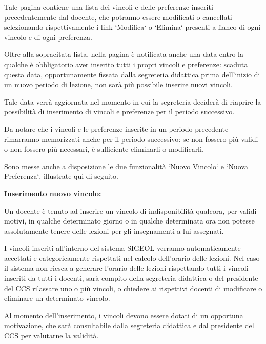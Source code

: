 \documentclass[11pt,a4paper]{article}
\begin{document}
Tale pagina contiene una lista dei vincoli e delle preferenze inseriti precedentemente dal docente, che potranno essere modificati o cancellati selezionando rispettivamente i link `Modifica` o `Elimina` presenti a fianco di ogni vincolo e di ogni preferenza.

Oltre alla sopracitata lista, nella pagina è notificata anche una data entro la qualche è obbligatorio aver inserito tutti i propri vincoli e preferenze: scaduta questa data, opportunamente fissata dalla segreteria didattica prima dell'inizio di un nuovo periodo di lezione, non sarà più possibile inserire nuovi vincoli.

Tale data verrà aggiornata nel momento in cui la segreteria deciderà di riaprire la possibilità di inserimento di vincoli e preferenze per il periodo successivo.

Da notare che i vincoli e le preferenze inserite in un periodo precedente rimarranno memorizzati anche per il periodo successivo: se non fossero più validi o non fossero più necessari, è sufficiente eliminarli o modificarli.

Sono messe anche a disposizione le due funzionalità `Nuovo Vincolo` e `Nuova Preferenza`, illustrate qui di seguito.
\newline \newline \newline
\begin{large}\textbf{Inserimento nuovo vincolo:}\end{large}
\newline \newline
Un docente è tenuto ad inserire un vincolo di indisponibilità qualcora, per validi motivi, in qualche determinato giorno o in qualche determinata ora non potesse assolutamente tenere delle lezioni per gli insegnamenti a lui assegnati.

I vincoli inseriti all'interno del sistema SIGEOL verranno automaticamente accettati e categoricamente rispettati nel calcolo dell'orario delle lezioni.
Nel caso il sistema non riesca a generare l'orario delle lezioni rispettando tutti i vincoli inseriti da tutti i docenti, sarà compito della segreteria didattica o del presidente del CCS rilassare uno o più vincoli, o chiedere ai rispettivi docenti di modificare o eliminare un determinato vincolo.

Al momento dell'inserimento, i vincoli devono essere dotati di un opportuna motivazione, che sarà consultabile dalla segreteria didattica e dal presidente del CCS per valutarne la validità.
\end{document}
